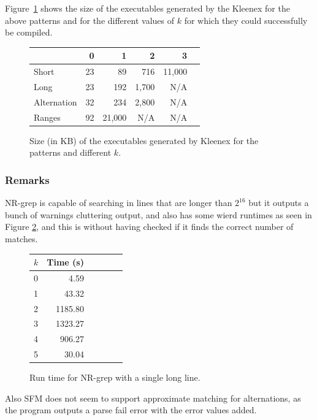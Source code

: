 Figure~\ref{fig:exec} shows the size of the executables generated by the
Kleenex for the above patterns and for the different values of $k$ for which
they could successfully be compiled.

\begin{figure}[!hb]
    \centering
    \begin{tabular}{l|rrrrr}
                    & 0     & 1     & 2     & 3\\\hline
        Short       & 23    & 89    & 716   & 11,000\\
        Long        & 23    & 192   & 1,700 & N/A\\
        Alternation & 32    & 234   & 2,800 & N/A\\
        Ranges      & 92    & 21,000& N/A   & N/A\\
    \end{tabular}
    \caption{Size (in KB) of the executables generated by Kleenex for the
      patterns and different $k$.}
    \label{fig:exec}
\end{figure}

\subsubsection{Remarks}
NR-grep is capable of searching in lines that are longer than $2^{16}$ but it
outputs a bunch of warnings cluttering output, and also has some wierd runtimes
as seen in Figure \ref{fig:nr-longline}, and this is without having checked if
it finds the correct number of matches.

\begin{figure}[!ht]
    \centering
    \begin{tabular}{l|rrrrr}
        $k$ & Time (s)\\\hline
        0   & 4.59\\
        1   & 43.32\\
        2   & 1185.80\\
        3   & 1323.27\\
        4   & 906.27\\
        5   & 30.04\\
    \end{tabular}
    \caption{Run time for NR-grep with a single long line.}
    \label{fig:nr-longline}
\end{figure}

Also SFM does not seem to support approximate matching for alternations, as the
program outputs a parse fail error with the error values added.


